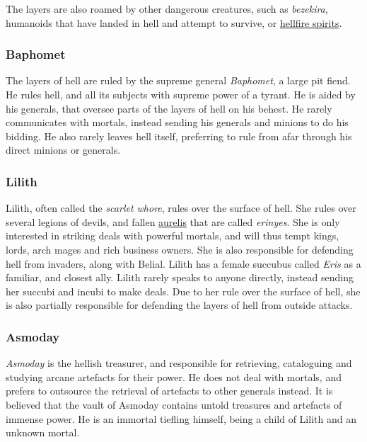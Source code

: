 The layers are also roamed by other dangerous creatures, such as
\emph{bezekira}, humanoids that have landed in hell and attempt to survive,
or \hyperref[sec:monster:Hellfire Spirit]{hellfire spirits}.

\subsubsection{Baphomet}
\label{sec:Baphomet}

The layers of hell are ruled by the supreme general \emph{Baphomet}, a large
pit fiend. He rules hell, and all its subjects with supreme power of a
tyrant. He is aided by his generals, that oversee parts of the layers of
hell on his behest. He rarely communicates with mortals, instead sending his
generals and minions to do his bidding. He also rarely leaves hell itself,
preferring to rule from afar through his direct minions or generals.

\subsubsection{Lilith}
\label{sec:Lilith}

Lilith, often called the \emph{scarlet whore}, rules over the surface of
hell. She rules over several legions of devils, and fallen
\hyperref[sec:Aurelis]{aurelis} that are called \emph{erinyes}. She is only
interested in striking deals with powerful mortals, and will thus tempt kings,
lords, arch mages and rich business owners. She is also responsible for
defending hell from invaders, along with Belial. Lilith has a female succubus
called \emph{Eris} as a familiar, and closest ally. Lilith rarely speaks to
anyone directly, instead sending her succubi and incubi to make deals. Due
to her rule over the surface of hell, she is also partially responsible for
defending the layers of hell from outside attacks.

\subsubsection{Asmoday}
\label{sec:Asmoday}

\emph{Asmoday} is the hellish treasurer, and responsible for retrieving,
cataloguing and studying arcane artefacts for their power. He does not deal
with mortals, and prefers to outsource the retrieval of artefacts to other
generals instead. It is believed that the vault of Asmoday contains untold
treasures and artefacts of immense power. He is an immortal tiefling himself,
being a child of Lilith and an unknown mortal.

